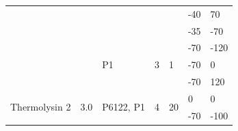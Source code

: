 \begin{table}[]
\begin{tabular}{@{}lllllll@{}}
                                &                                                                                &                                                                           &                                                              &                                                             & -40      & 70     \\
                                &                                                                                &                                                                           &                                                              &                                                             & -35      & -70    \\ \cmidrule(l){3-7} 
                                &                                                                                & \multirow{3}{*}{P1}                                                       & \multirow{3}{*}{3}                                           & \multirow{3}{*}{1}                                          & -70      & -120   \\
                                &                                                                                &                                                                           &                                                              &                                                             & -70      & 0      \\
                                &                                                                                &                                                                           &                                                              &                                                             & -70      & 120    \\ \midrule
\multirow{9}{*}{Thermolysin 2}  & \multirow{4}{*}{3.0}                                                           & \multirow{4}{*}{P6122, P1}                                                & \multirow{4}{*}{4}                                           & \multirow{4}{*}{20}                                         & 0        & 0      \\
                                &                                                                                &                                                                           &                                                              &                                                             & -70      & -100   \\

\end{tabular}
\end{table}
